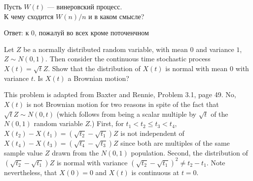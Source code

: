 \begin{problem}
Пусть $W(t)$ --- винеровский процесс. \\
К чему сходится $W(n)/n$ и в каком смысле? 
\end{problem} 
\begin{solution} 
Ответ: к 0, пожалуй во всех кроме поточенчном 
\end{solution}

\begin{problem}
  Let $Z$ be a normally distributed random variable, with mean
  $0$ and variance $1$, $Z \sim N(0,1)$.  Then consider the continuous
  time stochastic process $X(t) = \sqrt{t} Z$. Show that the distribution of
  $X(t)$ is normal with mean $0$ with variance $t$.  Is $X(t)$ a
  Brownian motion?
\end{problem} 
\begin{solution} 

This problem is adapted from Baxter and Rennie, Problem 3.1, page 49.
No, $X(t)$ is not Brownian motion for two reasons in spite of the fact
that $\sqrt{t} Z \sim N(0,t)$ (which follows from being a scalar
multiple by $\sqrt{t}$ of the $N(0,1)$ random variable $Z$.)
First, for $t_1 < t_2 \le t_3 < t_4$, $X(t_2) - X(t_1) = (\sqrt{t_2} -
\sqrt{t_1})Z$ is not independent of $X(t_4) - X(t_3) = (\sqrt{t_4} -
\sqrt{t_3})Z$ since both are multiples of the same sample value $Z$
drawn from the $N(0,1)$ population.
Second, the distribution of $(\sqrt{t_2} - \sqrt{t_1})Z$ is normal
with variance $(\sqrt{t_2} - \sqrt{t_1})^2 \ne t_2 - t_1$.
Note nevertheless, that $X(0) = 0$ and $X(t)$ is continuous at $t=0$.  
\end{solution}

